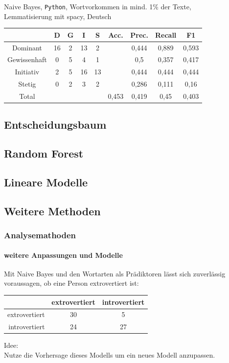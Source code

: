 \documentclass{beamer}
\begin{document}
\begin{frame}
\begin{center}
Naive Bayes, \texttt{Python}, Wortvorkommen in mind. 1\% der Texte,\\
Lemmatisierung mit spacy, Deutsch\
\begin{tabular}{|c|c|c|c|c|c|c|c|c|}
\hline
 & D 	& G	& I & S	& Acc.	& Prec. & Recall	& F1\\
\hline
Dominant & 16 & 2 & 13 & 2 & & 0,444 & 0,889 & 0,593\\
Gewissenhaft & 0 & 5 & 4 & 1 & & 0,5 & 0,357 & 0,417\\
Initiativ & 2 & 5 & 16 & 13& & 0,444 & 0,444 & 0,444\\
Stetig & 0 & 2 & 3 & 2& & 0,286 & 0,111 & 0,16 \\
\hline
Total  &   &   &   &   & 0,453 & 0,419  & 0,45   & 0,403\\
\hline
\end{tabular}
\end{center}
\end{frame}

\subsection{Entscheidungsbaum}
\subsection{Random Forest}
\subsection{Lineare Modelle}

\subsection{Weitere Methoden}
\begin{frame}
 \frametitle{Analysemathoden}
 \framesubtitle{weitere Anpassungen und Modelle}
 Mit Naive Bayes und den Wortarten als Prädiktoren lässt sich zuverlässig voraussagen,
 ob eine Person extrovertiert ist:\\
 \vspace{12pt}
 \begin{center}
 \begin{tabular}{r|c|c|}
  &  extrovertiert  & introvertiert \\
  \hline
  extrovertiert & 30 & 5  \\
  introvertiert & 24 & 27 \\
 \end{tabular} 
 \end{center}

 \vspace{12pt}
 
 Idee:\\
 Nutze die Vorhersage dieses Modells um ein neues Modell anzupassen.
\end{frame}
\end{document}

